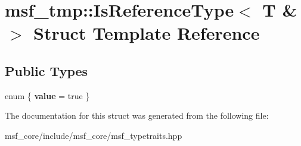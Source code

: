 \hypertarget{structmsf__tmp_1_1IsReferenceType_3_01T_01_6_01_4}{\section{msf\-\_\-tmp\-:\-:Is\-Reference\-Type$<$ T \& $>$ Struct Template Reference}
\label{structmsf__tmp_1_1IsReferenceType_3_01T_01_6_01_4}
}
\subsection*{Public Types}
\begin{DoxyCompactItemize}
\item 
enum \{ {\bfseries value} =  true
 \}
\end{DoxyCompactItemize}


The documentation for this struct was generated from the following file\-:\begin{DoxyCompactItemize}
\item 
msf\-\_\-core/include/msf\-\_\-core/msf\-\_\-typetraits.\-hpp\end{DoxyCompactItemize}
